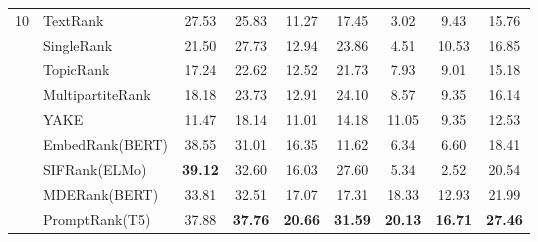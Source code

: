 \documentclass[11pt]{article}
\begin{document}
\begin{table*}[!t]
{\begin{tabular}{clccccccc}
\midrule
\midrule
\multirow{9}{*}{10} & TextRank                & 27.53  & 25.83       & 11.27       & 17.45   & 3.02     & 9.43  & 15.76                 \\
                     & SingleRank              & 21.50  & 27.73       & 12.94       & 23.86   & 4.51    & 10.53  & 16.85                 \\
                     & TopicRank               & 17.24  & 22.62       & 12.52       & 21.73   & 7.93     & 9.01  & 15.18                 \\
                     & MultipartiteRank        & 18.18  & 23.73       & 12.91       & 24.10   & 8.57     & 9.35  & 16.14                 \\
                     & YAKE                    & 11.47  & 18.14       & 11.01       & 14.18   & 11.05     & 9.35 & 12.53                 \\
                     & EmbedRank(BERT)         & 38.55  & 31.01       & 16.35       & 11.62   & 6.34     & 6.60  & 18.41                 \\
                     & SIFRank(ELMo)           & \textbf{39.12}  & 32.60       & 16.03       & 27.60   & 5.34     & 2.52  & 20.54                 \\
                     & MDERank(BERT)           & 33.81  & 32.51       & 17.07       & 17.31   & 18.33    & 12.93 & 21.99                 \\
                               
\cmidrule{2-9}
                     & PromptRank(T5)          & 37.88  & \textbf{37.76}       & \textbf{20.66}       & \textbf{31.59}   & \textbf{20.13}    & \textbf{16.71} & \textbf{27.46 }                \\
                                

\end{tabular}}
\end{table*}
\end{document}
